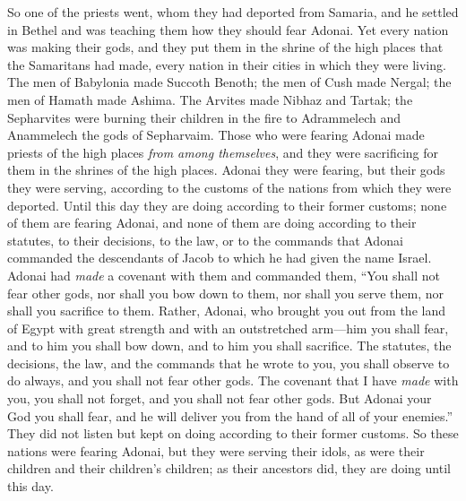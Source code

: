 \begin{biblechapter}
\verse So one of the priests went, whom they had deported from Samaria, and he settled in Bethel and was teaching them how they should fear Adonai.
\verse Yet every nation was making their gods, and they put them in the shrine of the high places that the Samaritans had made, every nation in their cities in which they were living.
\verse The men of Babylonia made Succoth Benoth; the men of Cush made Nergal; the men of Hamath made Ashima.
\verse The Arvites made Nibhaz and Tartak; the Sepharvites were burning their children in the fire to Adrammelech and Anammelech the gods of Sepharvaim.
\verse Those who were fearing Adonai made priests of the high places \textit{from among themselves}, and they were sacrificing for them in the shrines of the high places.
\verse Adonai they were fearing, but their gods they were serving, according to the customs of the nations from which they were deported.
\verse Until this day they are doing according to their former customs; none of them are fearing Adonai, and none of them are doing according to their statutes, to their decisions, to the law, or to the commands that Adonai commanded the descendants of Jacob to which he had given the name Israel.
\verse Adonai had \textit{made} a covenant with them and commanded them, “You shall not fear other gods, nor shall you bow down to them, nor shall you serve them, nor shall you sacrifice to them.
\verse Rather, Adonai, who brought you out from the land of Egypt with great strength and with an outstretched arm—him you shall fear, and to him you shall bow down, and to him you shall sacrifice.
\verse The statutes, the decisions, the law, and the commands that he wrote to you, you shall observe to do always, and you shall not fear other gods.
\verse The covenant that I have \textit{made} with you, you shall not forget, and you shall not fear other gods.
\verse But Adonai your God you shall fear, and he will deliver you from the hand of all of your enemies.”
\verse They did not listen but kept on doing according to their former customs.
\verse So these nations were fearing Adonai, but they were serving their idols, as were their children and their children’s children; as their ancestors did, they are doing until this day.
\end{biblechapter}


